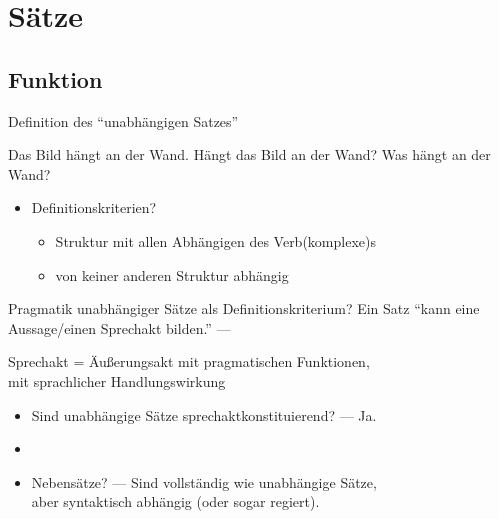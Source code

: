 \section{Sätze}

\subsection{Funktion}

\begin{frame}
  {Definition des "`unabhängigen Satzes"'}
  \pause
  \begin{exe}
    \ex Das Bild hängt an der Wand.
    \pause
    \ex Hängt das Bild an der Wand?
    \pause
    \ex Was hängt an der Wand?
  \end{exe}
  \pause
  \begin{itemize}[<+->]
    \item Definitionskriterien?
      \begin{itemize}[<+->]
        \item Struktur mit \alert{allen Abhängigen} des Verb(komplexe)s
        \item \alert{von keiner anderen Struktur abhängig}
      \end{itemize}
  \end{itemize}
\end{frame}

\begin{frame}
  {Pragmatik unabhängiger Sätze als Definitionskriterium?}
  \pause
  Ein Satz "`kann eine Aussage\slash einen Sprechakt bilden."' \pause --- 
  \pause
  \begin{exe}
    \ex\label{ex:hauptsatzundmatrixsatz007}
    \begin{xlist}
      \pause
      \pause
      \pause
    \end{xlist}
  \end{exe}
  \pause
  Sprechakt = Äußerungsakt mit pragmatischen Funktionen,\\
  mit sprachlicher Handlungswirkung
  \Viertelzeile
  \pause
  \begin{itemize}[<+->]
    \item Sind unabhängige Sätze \alert{sprechaktkonstituierend}? --- Ja.
    \item {}
    \item \alert{Nebensätze}? --- Sind \alert{vollständig} wie unabhängige Sätze,\\
      aber \alert{syntaktisch abhängig} (oder sogar \alert{regiert}).
  \end{itemize}
\end{frame}


